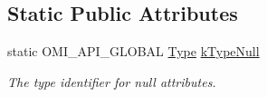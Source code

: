 \subsection*{Static Public Attributes}
\begin{DoxyCompactItemize}
\item 
static O\+M\+I\+\_\+\+A\+P\+I\+\_\+\+G\+L\+O\+B\+AL \hyperlink{classomi_1_1_attribute_aae4992bc8d2b12679548909bc813eecf}{Type} \hyperlink{classomi_1_1_attribute_ad919ae1483da537cec6e46b7debfaa89}{k\+Type\+Null}\hypertarget{classomi_1_1_attribute_ad919ae1483da537cec6e46b7debfaa89}{}\label{classomi_1_1_attribute_ad919ae1483da537cec6e46b7debfaa89}

\begin{DoxyCompactList}\small\item\em The type identifier for null attributes. \end{DoxyCompactList}\end{DoxyCompactItemize}
